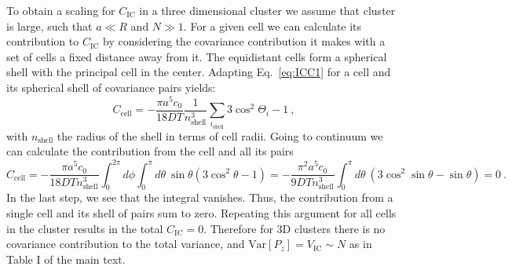 To obtain a scaling for $C_\text{IC}$ in a three dimensional cluster we assume that cluster is large, such that $a \ll R$ and $N \gg 1$. For a given cell we can calculate its contribution to $C_\text{IC}$ by considering the covariance contribution it makes with a set of cells a fixed distance away from it. The equidistant cells form a spherical shell with the principal cell in the center. Adapting Eq.\ \ref{eq:ICC1} for a cell and its spherical shell of covariance pairs yields:
\begin{equation}
    C_\text{cell} = -\frac{\pi a^5c_0}{18DT} \frac{1}{n_\text{shell}^3} \sum_{i_\text{shell}} 3\cos^2\Theta_{i}-1 \ ,
\end{equation}
with $n_\text{shell}$ the radius of the shell in terms of cell radii.
Going to continuum we can calculate the contribution from the cell and all its pairs
\begin{equation}
    C_\text{cell} = -\frac{\pi a^5c_0}{18DT n_\text{shell}^3} \int_0^{2\pi} d\phi \int_0^{\pi} d\theta \ \sin\theta (3\cos^2\theta-1) = -\frac{\pi^2 a^5c_0}{9DT n_\text{shell}^3} \int_0^\pi d\theta \ (3\cos^2\sin\theta - \sin\theta) = 0 \ .
\end{equation}
In the last step, we see that the integral vanishes. Thus, the contribution from a single cell and its shell of pairs sum to zero. Repeating this argument for all cells in the cluster results in the total $C_\text{IC} = 0$. Therefore for 3D clusters there is no covariance contribution to the total variance, and $\text{Var}[P_z] = V_\text{IC} \sim N$ as in Table I of the main text.



